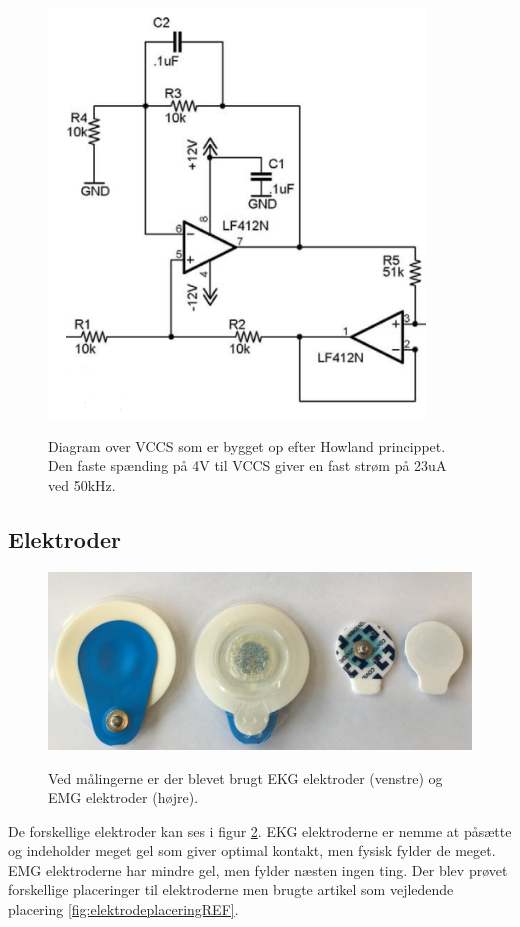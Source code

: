 \begin{figure}[H]
\centering
{\includegraphics[width=10cm]
{Figure/howland1}}
\caption{Diagram over VCCS som er bygget op efter Howland princippet. Den faste spænding på 4V til VCCS giver en fast strøm på 23uA ved 50kHz.}
\label{fig:howland1}
\end{figure}




\subsection{Elektroder}

\begin{figure}[H]
\centering
{\includegraphics[width=12cm]
{Figure/elektroder}}
\caption{Ved målingerne er der blevet brugt EKG elektroder (venstre) og EMG elektroder (højre).}
\label{fig:elektroder}
\end{figure}

De forskellige elektroder kan ses i figur \ref{fig:elektroder}. EKG elektroderne er nemme at påsætte og indeholder meget gel som giver optimal kontakt, men fysisk fylder de meget. EMG elektroderne har mindre gel, men fylder næsten ingen ting. Der blev prøvet forskellige placeringer til elektroderne men brugte artikel \cite{Nahrstaedt2012a} som vejledende placering \ref{fig:elektrodeplaceringREF}. 


